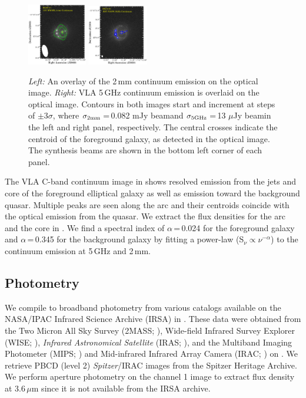 \documentclass[]{emulateapj}
\begin{document}
\begin{figure}[!htbp]
\centering
\includegraphics[width=0.23\textwidth]{../Figures/F555W_ContPdBI.eps}
\hspace{-0.5em}
\includegraphics[width=0.235\textwidth]{../Figures/F555W_ContVLA.eps}
\caption{{\it Left:} An overlay of the 2\,mm continuum emission on the optical image. 
{\it Right:} VLA 5\,GHz continuum emission is overlaid on the optical image. 
Contours in both images start and increment at steps of 
$\pm$3$\sigma$, where $\sigma_{\rm 2mm}$\,=\,0.082 mJy beam\pmOne and 
$\sigma_{\rm 5GHz}$\,=\,13 $\mu$Jy beam\pmOne in the left and right panel, respectively.
The central crosses indicate the centroid of the foreground galaxy,
as detected in the optical image. The synthesis beams are shown in the bottom left corner of each panel.
\label{fig:cont}}\vspace{0.51em}
\end{figure}

The VLA C-band continuum image in  shows resolved emission from the
jets and core of the foreground elliptical galaxy
as well as emission toward the background quasar.
Multiple peaks are seen along the arc and their centroids
coincide with the optical emission from the quasar.
We extract the flux densities for the arc and the core in .
We find a spectral index of $\alpha$\,=\,0.024 for the foreground
galaxy and $\alpha$\,=\,0.345 for the background galaxy by fitting a
power-law (S$_\nu \propto \nu^{-\alpha}$) to the continuum emission at
5\,GHz and 2\,mm.

\subsection{Photometry} \label{sec:photometry} %
We compile \mir to \fir broadband photometry from various
catalogs available on the NASA/IPAC Infrared Science
Archive (IRSA) in . These data were obtained from
the Two Micron All Sky Survey (2MASS; \citealt{Skrutskie06a}),
Wide-field Infrared Survey Explorer (WISE; \citealt{Wright10a}),
{\it Infrared Astronomical Satellite} (IRAS; \citealt{Neugebauer84a}), and
the Multiband Imaging Photometer (MIPS; \citealt{Rieke04a}) and
Mid-infrared Infrared Array Camera (IRAC; \citealt{Fazio04a}) on
\spitzer. We retrieve PBCD (level 2) {\it Spitzer}/IRAC images from the
Spitzer Heritage Archive. We perform aperture photometry on
the channel 1 image to extract flux density at 3.6\,$\mu$m
since it is not available from the IRSA archive.
\end{document}
